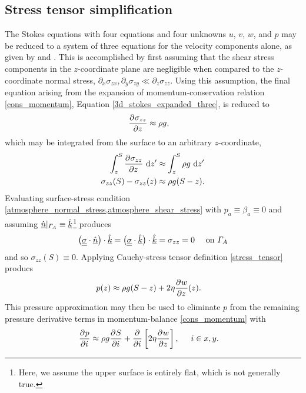 \subsection{Stress tensor simplification}

The Stokes equations with four equations and four unknowns $u$, $v$, $w$, and $p$ may be reduced to a system of three equations for the velocity components alone, as given by \citet{blatter_1995} and \citet{pattyn_2003}.
This is accomplished by first assuming that the shear stress components in the $z$-coordinate plane are negligible when compared to the $z$-coordinate normal stress, \ie $\partial_x \sigma_{zx}, \partial_y \sigma_{zy} \ll \partial_z \sigma_{zz}$.
Using this assumption, the final equation arising from the expansion of momentum-conservation relation \cref{cons_momentum}, Equation \cref{3d_stokes_expanded_three}, is reduced to
\begin{align}
  \label{stress_tensor_simplification}
  \frac{\partial{^{}} \sigma_{zz}}{\partial z{^{}} } &\approx \rho g,
\end{align}
which may be integrated from the surface to an arbitrary $z$-coordinate,
\begin{align*}
  \int_z^S \frac{\partial{^{}} \sigma_{zz}}{\partial z{^{}} } \ \mathrm{d}z' &\approx \int_z^S \rho g \ \mathrm{d}z' \\
  \sigma_{zz}(S) - \sigma_{zz}(z) &\approx \rho g (S - z).
\end{align*}
Evaluating surface-stress condition \cref{atmosphere_normal_stress,atmosphere_shear_stress} with $p_a \equiv \beta_a \equiv 0$ and assuming $\underline{\hat{n}} |_{\varGamma_A} \equiv \underline{\hat{k}}$\footnote{Here, we assume the upper surface is entirely flat, which is not generally true.} produces
\begin{align*}
  \big( \underline{\underline{\sigma}} \cdot \underline{\hat{n}} \big) \cdot \underline{\hat{k}} = \big( \underline{\underline{\sigma}} \cdot \underline{\hat{k}} \big) \cdot \underline{\hat{k}} = \sigma_{zz} = 0  && \text{ on } \varGamma_A 
\end{align*}
and so $\sigma_{zz}(S) \equiv 0$.
Applying Cauchy-stress tensor definition \cref{stress_tensor} producs
\begin{align}
  \label{bp_pressure}
  p(z) &\approx \rho g(S - z) + 2\eta \frac{\partial{^{}} w}{\partial z{^{}} }(z).
\end{align}
This pressure approximation may then be used to eliminate $p$ from the remaining pressure derivative terms in momentum-balance \cref{cons_momentum} with
\begin{align}
  \label{bp_pressure_gradient}
  \frac{\partial{^{}} p}{\partial i{^{}} } &\approx
  \rho g\frac{\partial{^{}} S}{\partial i{^{}} } + \frac{\partial{^{}} }{\partial i{^{}} } \left[ 2\eta \frac{\partial{^{}} w}{\partial z{^{}} } \right], \hspace{5mm} i \in x,y.
\end{align}
